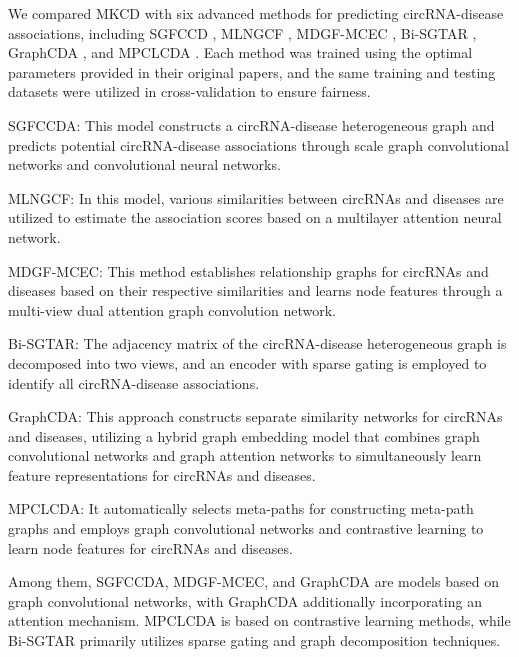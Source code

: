 \documentclass[journal,twoside,web]{ieeecolor}
\begin{document}
We compared MKCD with six advanced methods for predicting circRNA-disease associations, including SGFCCD \cite{shang2024sgfccda}, MLNGCF \cite{wu2023mlngcf}, MDGF-MCEC \cite{wu2022mdgf}, Bi-SGTAR \cite{li2024bi}, GraphCDA \cite{dai2022graphcda}, and MPCLCDA \cite{liu2023mpclcda}. Each method was trained using the optimal parameters provided in their original papers, and the same training and testing datasets were utilized in cross-validation to ensure fairness. 

SGFCCDA: This model constructs a circRNA-disease heterogeneous graph and predicts potential circRNA-disease associations through scale graph convolutional networks and convolutional neural networks.

MLNGCF: In this model, various similarities between circRNAs and diseases are utilized to estimate the association scores based on a multilayer attention neural network.

MDGF-MCEC: This method establishes relationship graphs for circRNAs and diseases based on their respective similarities and learns node features through a multi-view dual attention graph convolution network.

Bi-SGTAR: The adjacency matrix of the circRNA-disease heterogeneous graph is decomposed into two views, and an encoder with sparse gating is employed to identify all circRNA-disease associations.

GraphCDA: This approach constructs separate similarity networks for circRNAs and diseases, utilizing a hybrid graph embedding model that combines graph convolutional networks and graph attention networks to simultaneously learn feature representations for circRNAs and diseases.

MPCLCDA: It automatically selects meta-paths for constructing meta-path graphs and employs graph convolutional networks and contrastive learning to learn node features for circRNAs and diseases.

Among them, SGFCCDA, MDGF-MCEC, and GraphCDA are models based on graph convolutional networks, with GraphCDA additionally incorporating an attention mechanism. MPCLCDA is based on contrastive learning methods, while Bi-SGTAR primarily utilizes sparse gating and graph decomposition techniques. %
\end{document}

